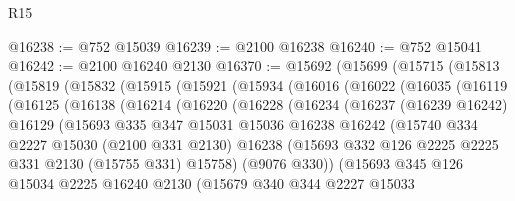 \begin{lexlean}{R15}
\begin{coremodule}
@16238 := @752 @15039
@16239 := @2100 @16238
@16240 := @752 @15041
@16242 := @2100 @16240 @2130
@16370 := @15692
    (@15699
      (@15715
        (@15813
          (@15819
            (@15832
              (@15915
                (@15921
                  (@15934
                    (@16016
                      (@16022
                        (@16035
                          (@16119
                            (@16125
                              (@16138
                                (@16214
                                  (@16220
                                    (@16228
                                      (@16234
                                        (@16237
                                          (@16239 @16242)
                                          @16129
                                          (@15693
                                            @335
                                            @347
                                            @15031
                                            @15036
                                            @16238
                                            @16242
                                            (@15740
                                              @334
                                              @2227
                                              @15030
                                              (@2100 @331 @2130)
                                              @16238
                                              (@15693
                                                @332
                                                @126
                                                @2225
                                                @2225
                                                @331
                                                @2130
                                                (@15755 @331)
                                                @15758)
                                              (@9076 @330))
                                            (@15693
                                              @345
                                              @126
                                              @15034
                                              @2225
                                              @16240
                                              @2130
                                              (@15679
                                                @340
                                                @344
                                                @2227
                                                @15033

\end{coremodule}
\end{lexlean}

